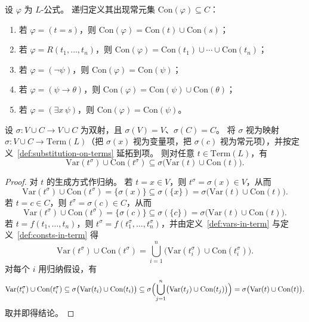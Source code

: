 \documentclass[lang=cn,a4paper,newtx,section]{elegantbook}
\begin{document}
\begin{definition}[公式中出现的常元]
\label{consts-in-formula}
设 $\varphi$ 为 $L$-公式。
递归定义其出现常元集 $\mathrm{Con}(\varphi)\subseteq C$：
\begin{enumerate}
  \item 若 $\varphi=(t=s)$，则 $\mathrm{Con}(\varphi)=\mathrm{Con}(t)\cup\mathrm{Con}(s)$；
  \item 若 $\varphi=R(t_1,\dots,t_n)$，则 $\mathrm{Con}(\varphi)=\mathrm{Con}(t_1)\cup\cdots\cup\mathrm{Con}(t_n)$；
  \item 若 $\varphi=(\neg\psi)$，则 $\mathrm{Con}(\varphi)=\mathrm{Con}(\psi)$；
  \item 若 $\varphi=(\psi\to\theta)$，则 $\mathrm{Con}(\varphi)=\mathrm{Con}(\psi)\cup\mathrm{Con}(\theta)$；
  \item 若 $\varphi=(\exists x\,\psi)$，则 $\mathrm{Con}(\varphi)=\mathrm{Con}(\psi)$。
\end{enumerate}
\end{definition}

\begin{lemma}[置换下项的出现符号]
\label{term-symbols-under-permutation}
设 $\sigma:V\cup C\to V\cup C$ 为双射，且 $\sigma(V)=V$、$\sigma(C)=C$。
将 $\sigma$ 视为映射 $\sigma:V\cup C\to\mathrm{Term}(L)$（把 $\sigma(x)$ 视为变量项，把 $\sigma(c)$ 视为常元项），并按定义~\ref{def:substitution-on-terms} 延拓到项。
则对任意 $t\in\mathrm{Term}(L)$，有
\[
  \mathrm{Var}(t^{\sigma})\cup\mathrm{Con}(t^{\sigma})\subseteq \sigma\bigl(\mathrm{Var}(t)\cup\mathrm{Con}(t)\bigr).
\]
\end{lemma}

\begin{proof}
对 $t$ 的生成方式作归纳。
若 $t=x\in V$，则 $t^{\sigma}=\sigma(x)\in V$，从而
\[
  \mathrm{Var}(t^{\sigma})\cup\mathrm{Con}(t^{\sigma})=\{\sigma(x)\}\subseteq\sigma(\{x\})=\sigma\bigl(\mathrm{Var}(t)\cup\mathrm{Con}(t)\bigr).
\]
若 $t=c\in C$，则 $t^{\sigma}=\sigma(c)\in C$，从而
\[
  \mathrm{Var}(t^{\sigma})\cup\mathrm{Con}(t^{\sigma})=\{\sigma(c)\}\subseteq\sigma(\{c\})=\sigma\bigl(\mathrm{Var}(t)\cup\mathrm{Con}(t)\bigr).
\]
若 $t=f(t_1,\dots,t_n)$，则 $t^{\sigma}=f(t_1^{\sigma},\dots,t_n^{\sigma})$，并由定义~\ref{def:vars-in-term} 与定义~\ref{def:consts-in-term} 得
\[
  \mathrm{Var}(t^{\sigma})\cup\mathrm{Con}(t^{\sigma})=\bigcup_{i=1}^n\bigl(\mathrm{Var}(t_i^{\sigma})\cup\mathrm{Con}(t_i^{\sigma})\bigr).
\]
对每个 $i$ 用归纳假设，有
\[
  \mathrm{Var}(t_i^{\sigma})\cup\mathrm{Con}(t_i^{\sigma})\subseteq\sigma\bigl(\mathrm{Var}(t_i)\cup\mathrm{Con}(t_i)\bigr)\subseteq\sigma\Bigl(\bigcup_{j=1}^n\bigl(\mathrm{Var}(t_j)\cup\mathrm{Con}(t_j)\bigr)\Bigr)=\sigma\bigl(\mathrm{Var}(t)\cup\mathrm{Con}(t)\bigr).
\]
取并即得结论。
\end{proof}
\end{document}
